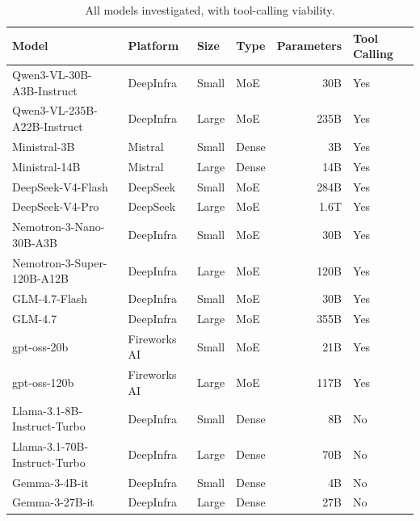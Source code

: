 
\begin{table}[htbp]
\centering
\caption{All models investigated, with tool-calling viability.}
\label{tab:model-panel-overview}
\begin{tabular}{@{}l l l l r l@{}}
\toprule
Model & Platform & Size & Type & Parameters & Tool Calling \\
\midrule
Qwen3-VL-30B-A3B-Instruct     & DeepInfra     & Small & MoE   & 30B   & Yes \\
Qwen3-VL-235B-A22B-Instruct   & DeepInfra     & Large & MoE   & 235B  & Yes \\
Ministral-3B                  & Mistral       & Small & Dense & 3B    & Yes \\
Ministral-14B                 & Mistral       & Large & Dense & 14B   & Yes \\
DeepSeek-V4-Flash             & DeepSeek      & Small & MoE   & 284B  & Yes \\
DeepSeek-V4-Pro               & DeepSeek     & Large & MoE   & 1.6T  & Yes \\
Nemotron-3-Nano-30B-A3B       & DeepInfra     & Small & MoE   & 30B   & Yes \\
Nemotron-3-Super-120B-A12B    & DeepInfra     & Large & MoE   & 120B  & Yes \\
GLM-4.7-Flash                 & DeepInfra     & Small & MoE   & 30B   & Yes \\
GLM-4.7                       & DeepInfra     & Large & MoE   & 355B  & Yes \\
gpt-oss-20b                   & Fireworks AI  & Small & MoE   & 21B   & Yes \\
gpt-oss-120b                  & Fireworks AI  & Large & MoE   & 117B  & Yes \\
Llama-3.1-8B-Instruct-Turbo   & DeepInfra     & Small & Dense & 8B    & No \\
Llama-3.1-70B-Instruct-Turbo  & DeepInfra     & Large & Dense & 70B   & No \\
Gemma-3-4B-it                 & DeepInfra     & Small & Dense & 4B    & No \\
Gemma-3-27B-it                & DeepInfra     & Large & Dense & 27B   & No \\
\bottomrule
\end{tabular}
\end{table}

